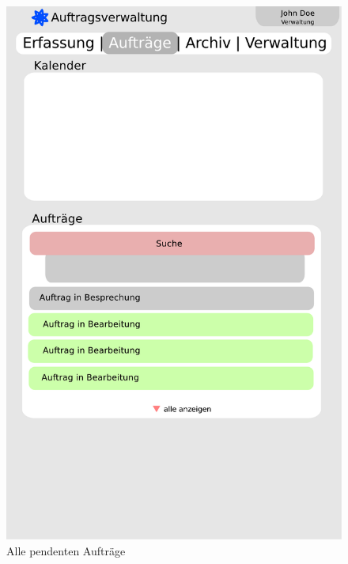 \documentclass[ngerman, 12pt, pdftex]{scrartcl}[2006/07/30]
\begin{document}
\begin{figure}[p]
\centering
	\begin{minipage}{0.4\textwidth}
		\centering
		\includegraphics[scale=0.3]{./design/overview_order.pdf}
		\caption{Alle pendenten Aufträge}
 	\end{minipage}\hfill
    \begin{minipage}{0.4\textwidth}
   		\centering

\end{minipage}
\end{figure}
\end{document}
